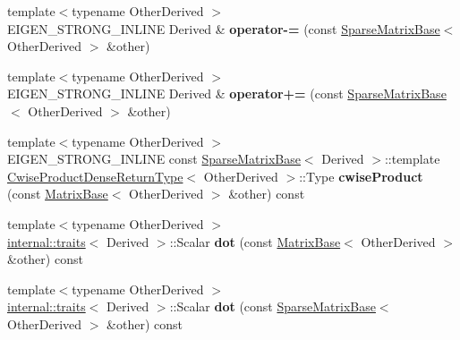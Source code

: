 \begin{DoxyCompactItemize}
\item 
\mbox{\label{class_eigen_1_1_sparse_matrix_base_aa6c7be58928084ed948e4f7f1e698f44}} 
{\footnotesize template$<$typename Other\+Derived $>$ }\\E\+I\+G\+E\+N\+\_\+\+S\+T\+R\+O\+N\+G\+\_\+\+I\+N\+L\+I\+NE Derived \& {\bfseries operator-\/=} (const \mbox{\hyperlink{class_eigen_1_1_sparse_matrix_base}{Sparse\+Matrix\+Base}}$<$ Other\+Derived $>$ \&other)
\item 
\mbox{\label{class_eigen_1_1_sparse_matrix_base_a72331da8e6a559e03fa03d46e3ad4f58}} 
{\footnotesize template$<$typename Other\+Derived $>$ }\\E\+I\+G\+E\+N\+\_\+\+S\+T\+R\+O\+N\+G\+\_\+\+I\+N\+L\+I\+NE Derived \& {\bfseries operator+=} (const \mbox{\hyperlink{class_eigen_1_1_sparse_matrix_base}{Sparse\+Matrix\+Base}}$<$ Other\+Derived $>$ \&other)
\item 
\mbox{\label{class_eigen_1_1_sparse_matrix_base_a511c5df98477da350fba18ac562ed06b}} 
{\footnotesize template$<$typename Other\+Derived $>$ }\\E\+I\+G\+E\+N\+\_\+\+S\+T\+R\+O\+N\+G\+\_\+\+I\+N\+L\+I\+NE const \mbox{\hyperlink{class_eigen_1_1_sparse_matrix_base}{Sparse\+Matrix\+Base}}$<$ Derived $>$\+::template \mbox{\hyperlink{struct_eigen_1_1_sparse_matrix_base_1_1_cwise_product_dense_return_type}{Cwise\+Product\+Dense\+Return\+Type}}$<$ Other\+Derived $>$\+::Type {\bfseries cwise\+Product} (const \mbox{\hyperlink{class_eigen_1_1_matrix_base}{Matrix\+Base}}$<$ Other\+Derived $>$ \&other) const
\item 
\mbox{\label{class_eigen_1_1_sparse_matrix_base_aa449ebc968d7ed08aca2b18caca8ae91}} 
{\footnotesize template$<$typename Other\+Derived $>$ }\\\mbox{\hyperlink{struct_eigen_1_1internal_1_1traits}{internal\+::traits}}$<$ Derived $>$\+::Scalar {\bfseries dot} (const \mbox{\hyperlink{class_eigen_1_1_matrix_base}{Matrix\+Base}}$<$ Other\+Derived $>$ \&other) const
\item 
\mbox{\label{class_eigen_1_1_sparse_matrix_base_a6cc2a5ef66cd50f67dc7136fa15eeeee}} 
{\footnotesize template$<$typename Other\+Derived $>$ }\\\mbox{\hyperlink{struct_eigen_1_1internal_1_1traits}{internal\+::traits}}$<$ Derived $>$\+::Scalar {\bfseries dot} (const \mbox{\hyperlink{class_eigen_1_1_sparse_matrix_base}{Sparse\+Matrix\+Base}}$<$ Other\+Derived $>$ \&other) const

\end{DoxyCompactItemize}
